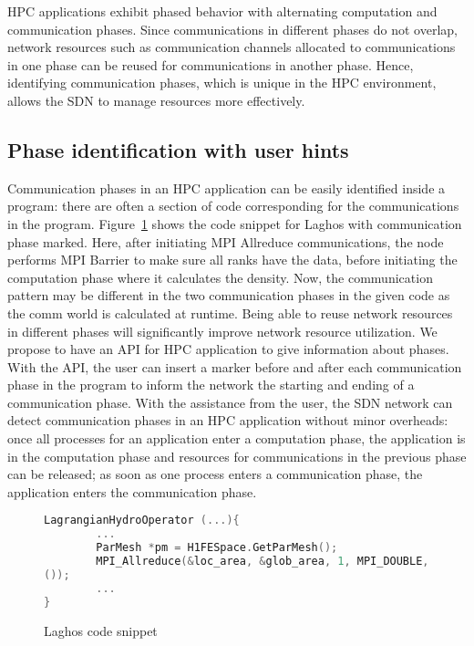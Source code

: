 
HPC applications exhibit phased behavior with alternating
computation and communication phases. Since communications in different
phases do not overlap, network resources such as communication channels
allocated to communications in one phase can be reused for communications
in another phase. Hence, identifying communication phases, which is unique
in the HPC environment, allows the SDN to manage resources more effectively.

\subsection{Phase identification with user hints}

Communication phases in an HPC application can be easily identified
inside a program: there are often a section of code corresponding
for the communications in the program. Figure~\ref{code.laghos.1}
shows the code snippet for Laghos with communication phase marked. 
Here, after initiating MPI Allreduce
communications, the node performs MPI Barrier to make sure all ranks 
have the data, before initiating the computation phase where
it calculates the density.
Now, the communication pattern may be different in the two
communication phases in the given code as the comm world is calculated
at runtime. Being able to reuse network resources in different phases will
significantly improve network resource utilization. 
We propose to have an API for HPC application to give
information about phases. With the API, the user can insert a marker before
and after each communication
phase in the program to inform the network the starting and
ending of a communication phase. With the assistance from the user,
the SDN network can detect communication phases in an HPC application
without minor overheads: once all processes for an application
enter a computation phase, the application is in the computation phase and
resources for communications in the previous phase can be released; as
soon as one process enters a communication phase, the application enters
the communication phase. 

\begin{figure}[H]
\begin{lstlisting}[breaklines, language=C++, frame=single, tabsize=4, basicstyle=\ttfamily]
LagrangianHydroOperator (...){
        ...
        ParMesh *pm = H1FESpace.GetParMesh();
        MPI_Allreduce(&loc_area, &glob_area, 1, MPI_DOUBLE, MPI_SUM, pm->GetComm
());
        ...
}
\end{lstlisting}
\caption{Laghos code snippet}
\label{code.laghos.1}
\end{figure}

